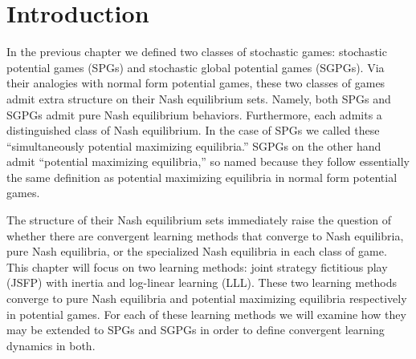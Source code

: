 \section{Introduction}

In the previous chapter we defined two classes of stochastic games: stochastic potential games (SPGs) and stochastic global potential games (SGPGs). Via their analogies with normal form potential games, these two classes of games admit extra structure on their Nash equilibrium sets. Namely, both SPGs and SGPGs admit pure Nash equilibrium behaviors. Furthermore, each admits a distinguished class of Nash equilibrium. In the case of SPGs we called these ``simultaneously potential maximizing equilibria.'' SGPGs on the other hand admit ``potential maximizing equilibria,'' so named because they follow essentially the same definition as potential maximizing equilibria in normal form potential games. 

The structure of their Nash equilibrium sets immediately raise the question of whether there are convergent learning methods that converge to Nash equilibria, pure Nash equilibria, or the specialized Nash equilibria in each class of game. This chapter will focus on two learning methods: joint strategy fictitious play (JSFP) with inertia and log-linear learning (LLL). These two learning methods converge to pure Nash equilibria and potential maximizing equilibria respectively in potential games. For each of these learning methods we will examine how they may be extended to SPGs and SGPGs in order to define convergent learning dynamics in both. 